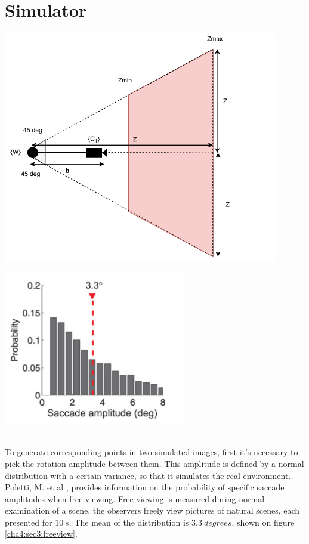 \section{Simulator}
\label{rienreive}
\begin{minipage}{0.5\textwidth}
	\centering
	\includegraphics[width=0.9\textwidth]{images/rangesim.pdf}
	\label{cha4:sec3:rangesim}
\end{minipage}
\begin{minipage}{0.5\textwidth}
	\centering
	\includegraphics[width=0.6\textwidth]{images/freeview.png}
	\label{cha4:sec3:freeview}
\end{minipage}\\

To generate corresponding points in two simulated images, first it's necessary to pick the rotation amplitude between them. This amplitude is defined by a normal distribution with a certain variance, so that it simulates the real environment. Poletti, M. et al \cite{saccadeamp}, provides information on the probability of specific \gls{saccade} amplitudes when free viewing. Free viewing is measured during normal examination of a scene, the observers freely view pictures of natural scenes, each presented for $10 \ s$. The mean of the distribution is $3.3 \ degrees$, shown on figure \ref{cha4:sec3:freeview}.

